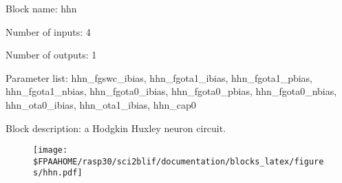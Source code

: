 \pagebreak

Block name: hhn

Number of inputs: 4

Number of outputs: 1

Parameter list: hhn\_fgswc\_ibias, hhn\_fgota1\_ibias, hhn\_fgota1\_pbias, hhn\_fgota1\_nbias, hhn\_fgota0\_ibias, hhn\_fgota0\_pbias, hhn\_fgota0\_nbias, hhn\_ota0\_ibias, hhn\_ota1\_ibias, hhn\_cap0

Block description: 
a Hodgkin Huxley neuron circuit. 

\begin{figure}[H]  %
\texttt{[image: \$FPAAHOME/rasp30/sci2blif/documentation/blocks\_latex/figures/hhn.pdf]}
\end{figure}

